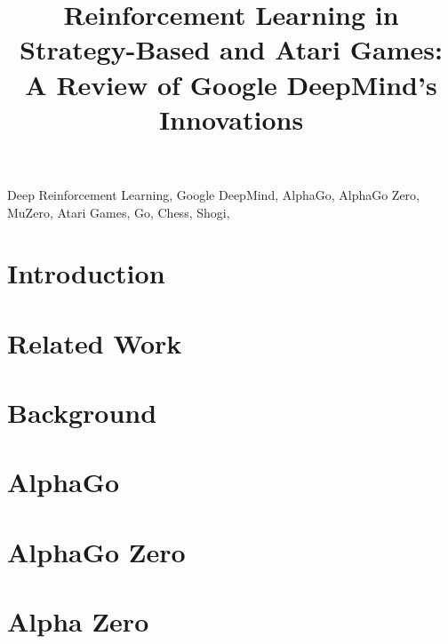 \documentclass[conference]{IEEEtran}
\begin{document}
\title{Reinforcement Learning in Strategy-Based and Atari Games: A Review of Google DeepMind's Innovations\\}



\maketitle
\thispagestyle{plain}
\pagestyle{plain}
\begin{abstract}

    

\end{abstract}

\begin{IEEEkeywords}
    Deep Reinforcement Learning, Google DeepMind, AlphaGo, AlphaGo Zero, MuZero, Atari Games, Go, Chess, Shogi,
\end{IEEEkeywords}

\section{Introduction}


\section{Related Work}


\section{Background}


\section{AlphaGo}


\section{AlphaGo Zero}


\section{Alpha Zero}

\end{document}
